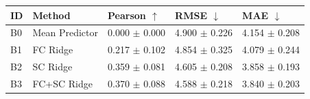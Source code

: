 \begin{tabular}{lllll}
\toprule
ID & Method & Pearson $\uparrow$ & RMSE $\downarrow$ & MAE $\downarrow$ \\
\midrule
B0 & Mean Predictor & 0.000 $\pm$ 0.000 & 4.900 $\pm$ 0.226 & 4.154 $\pm$ 0.208 \\
B1 & FC Ridge & 0.217 $\pm$ 0.102 & 4.854 $\pm$ 0.325 & 4.079 $\pm$ 0.244 \\
B2 & SC Ridge & 0.359 $\pm$ 0.081 & 4.605 $\pm$ 0.208 & 3.858 $\pm$ 0.193 \\
B3 & FC+SC Ridge & 0.370 $\pm$ 0.088 & 4.588 $\pm$ 0.218 & 3.840 $\pm$ 0.203 \\
\bottomrule
\end{tabular}
